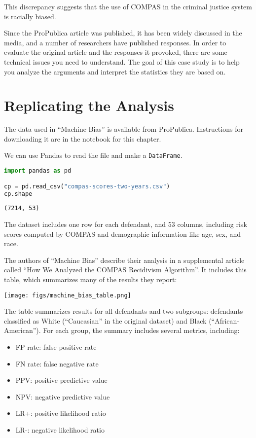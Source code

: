 This discrepancy suggests that the use of COMPAS in the criminal justice
system is racially biased.

Since the ProPublica article was published, it has been widely discussed
in the media, and a number of researchers have published responses. In
order to evaluate the original article and the responses it provoked,
there are some technical issues you need to understand. The goal of this
case study is to help you analyze the arguments and interpret the
statistics they are based on.

\section{Replicating the Analysis}\label{replicating-the-analysis}

The data used in ``Machine Bias'' is available from ProPublica.
Instructions for downloading it are in the notebook for this chapter.

We can use Pandas to read the file and make a
\passthrough{\lstinline!DataFrame!}.

\begin{lstlisting}[language=Python,style=source]
import pandas as pd

cp = pd.read_csv("compas-scores-two-years.csv")
cp.shape
\end{lstlisting}

\begin{lstlisting}[style=output]
(7214, 53)
\end{lstlisting}

The dataset includes one row for each defendant, and 53 columns,
including risk scores computed by COMPAS and demographic information
like age, sex, and race.

The authors of ``Machine Bias'' describe their analysis in a
supplemental article called ``How We Analyzed the COMPAS Recidivism
Algorithm''. It includes this table, which summarizes many of the
results they report:

\texttt{[image: figs/machine\_bias\_table.png]}

The table summarizes results for all defendants and two subgroups:
defendants classified as White (``Caucasian'' in the original dataset)
and Black (``African-American''). For each group, the summary includes
several metrics, including:

\begin{itemize}

\item
  FP rate: false positive rate
\item
  FN rate: false negative rate
\item
  PPV: positive predictive value
\item
  NPV: negative predictive value
\item
  LR+: positive likelihood ratio
\item
  LR-: negative likelihood ratio
\end{itemize}

